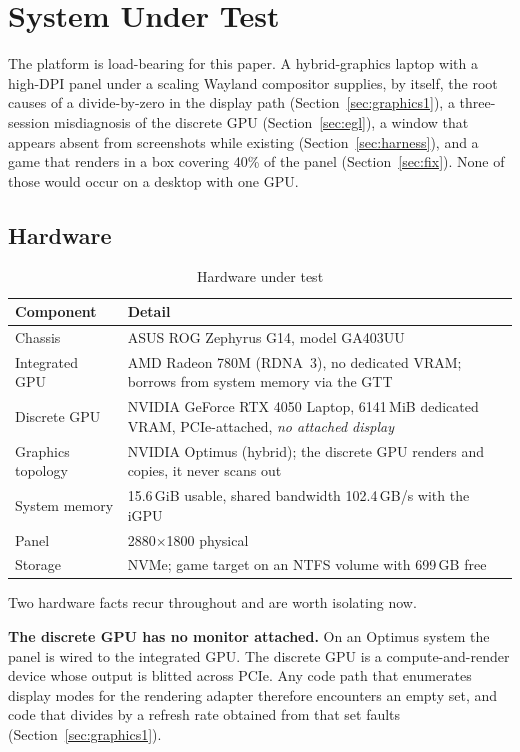\section{System Under Test}
\label{sec:system}

The platform is load-bearing for this paper. A hybrid-graphics laptop with a
high-DPI panel under a scaling Wayland compositor supplies, by itself, the root
causes of a divide-by-zero in the display path (Section~\ref{sec:graphics1}), a
three-session misdiagnosis of the discrete GPU (Section~\ref{sec:egl}), a
window that appears absent from screenshots while existing (Section~\ref{sec:harness}),
and a game that renders in a box covering 40\% of the panel
(Section~\ref{sec:fix}). None of those would occur on a desktop with one GPU.

\subsection{Hardware}

\begin{table}[htbp]
\caption{Hardware under test}
\label{tab:hw}
\centering
\footnotesize
\begin{tabularx}{\columnwidth}{@{}lX@{}}
\toprule
\textbf{Component} & \textbf{Detail} \\
\midrule
Chassis & ASUS ROG Zephyrus G14, model GA403UU \\
Integrated GPU & AMD Radeon 780M (RDNA~3), no dedicated VRAM; borrows from
                 system memory via the GTT \\
Discrete GPU & NVIDIA GeForce RTX 4050 Laptop, 6141\,MiB dedicated VRAM,
               PCIe-attached, \emph{no attached display} \\
Graphics topology & NVIDIA Optimus (hybrid); the discrete GPU renders and
                    copies, it never scans out \\
System memory & 15.6\,GiB usable, shared bandwidth 102.4\,GB/s with the iGPU \\
Panel & 2880$\times$1800 physical \\
Storage & NVMe; game target on an NTFS volume with 699\,GB free \\
\bottomrule
\end{tabularx}
\end{table}

Two hardware facts recur throughout and are worth isolating now.

\textbf{The discrete GPU has no monitor attached.} On an Optimus system the panel
is wired to the integrated GPU. The discrete GPU is a compute-and-render device
whose output is blitted across PCIe. Any code path that enumerates display modes
for the rendering adapter therefore encounters an empty set, and code that
divides by a refresh rate obtained from that set faults
(Section~\ref{sec:graphics1}).

